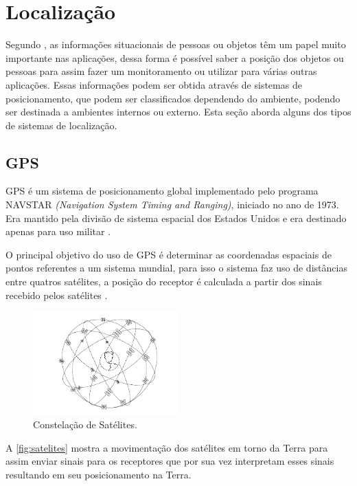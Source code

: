 \section{Localização}
\par
Segundo , as informações situacionais de pessoas ou objetos têm um papel muito importante nas aplicações, dessa forma é possível saber a posição dos objetos ou pessoas para assim fazer um monitoramento ou utilizar para várias outras aplicações. Essas informações podem ser obtida através de sistemas de posicionamento, que podem ser classificados dependendo do ambiente, podendo ser destinada a ambientes internos ou externo. Esta seção aborda alguns dos tipos de sistemas de localização.
    \subsection{GPS}
    \par
    GPS é um sistema de posicionamento global implementado pelo programa NAVSTAR \textit{(Navigation System Timing and Ranging)}, iniciado no ano de 1973. Era mantido pela divisão de sistema espacial dos Estados Unidos e era destinado apenas para uso militar \cite{gpsEduardo2005}.
    \par
   O principal objetivo do uso de GPS é determinar as coordenadas espaciais de pontos referentes a um sistema mundial, para isso o sistema faz uso de distâncias entre quatros satélites, a posição do receptor é calculada a partir dos sinais recebido pelos satélites \cite{gpsEduardo2005}.

   \begin{figure}[H]
              \caption{\label{fig:satelites}{Constelação de Satélites.}}
              \centering
              \includegraphics[width=0.5\textwidth]{Figuras/gps_satelites.PNG}
        \end{figure}
        \par
        A  \autoref{fig:satelites} mostra a movimentação dos satélites em torno da Terra para assim enviar sinais para os receptores que por sua vez interpretam esses sinais resultando em seu posicionamento na Terra.
 
